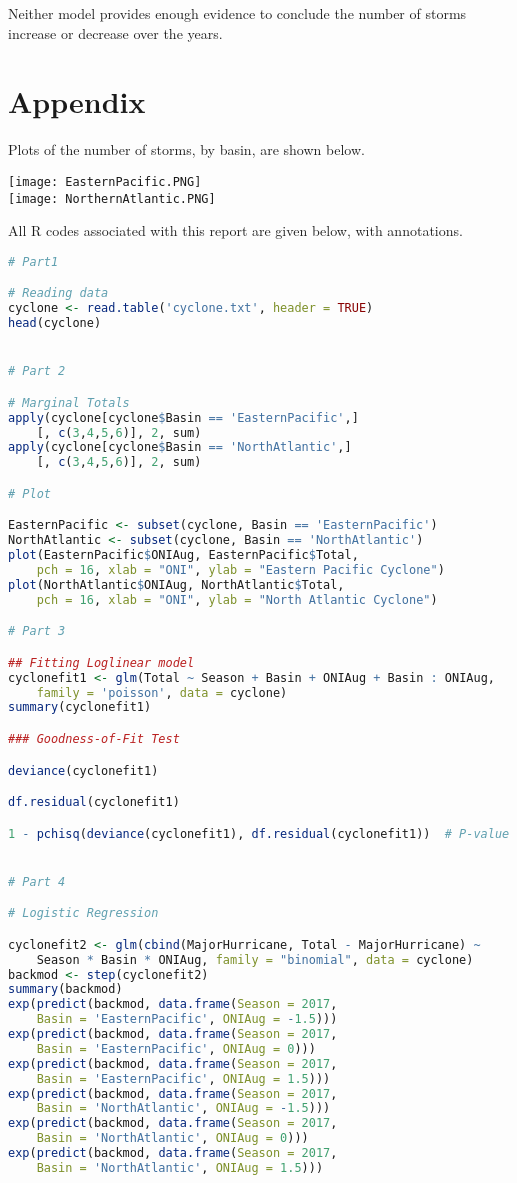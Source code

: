 \documentclass[12pt,a4paper]{article}
\begin{document}
Neither model provides enough evidence to conclude the number of storms increase or decrease over the years.

\section{Appendix}

Plots of the number of storms, by basin, are shown below.

\texttt{[image: EasternPacific.PNG]}\\
\texttt{[image: NorthernAtlantic.PNG]}

All R codes associated with this report are given below, with annotations.

\begin{lstlisting}[language=R]
# Part1

# Reading data
cyclone <- read.table('cyclone.txt', header = TRUE)
head(cyclone)


# Part 2

# Marginal Totals
apply(cyclone[cyclone$Basin == 'EasternPacific',]
	[, c(3,4,5,6)], 2, sum)
apply(cyclone[cyclone$Basin == 'NorthAtlantic',]
	[, c(3,4,5,6)], 2, sum)

# Plot

EasternPacific <- subset(cyclone, Basin == 'EasternPacific')
NorthAtlantic <- subset(cyclone, Basin == 'NorthAtlantic')
plot(EasternPacific$ONIAug, EasternPacific$Total, 
	pch = 16, xlab = "ONI", ylab = "Eastern Pacific Cyclone")
plot(NorthAtlantic$ONIAug, NorthAtlantic$Total, 
	pch = 16, xlab = "ONI", ylab = "North Atlantic Cyclone")

# Part 3

## Fitting Loglinear model
cyclonefit1 <- glm(Total ~ Season + Basin + ONIAug + Basin : ONIAug, 
	family = 'poisson', data = cyclone)
summary(cyclonefit1)

### Goodness-of-Fit Test

deviance(cyclonefit1)

df.residual(cyclonefit1)

1 - pchisq(deviance(cyclonefit1), df.residual(cyclonefit1))  # P-value


# Part 4

# Logistic Regression

cyclonefit2 <- glm(cbind(MajorHurricane, Total - MajorHurricane) ~ 
	Season * Basin * ONIAug, family = "binomial", data = cyclone)
backmod <- step(cyclonefit2)
summary(backmod)
exp(predict(backmod, data.frame(Season = 2017, 
	Basin = 'EasternPacific', ONIAug = -1.5)))
exp(predict(backmod, data.frame(Season = 2017, 
	Basin = 'EasternPacific', ONIAug = 0)))
exp(predict(backmod, data.frame(Season = 2017, 
	Basin = 'EasternPacific', ONIAug = 1.5)))
exp(predict(backmod, data.frame(Season = 2017, 
	Basin = 'NorthAtlantic', ONIAug = -1.5)))
exp(predict(backmod, data.frame(Season = 2017, 
	Basin = 'NorthAtlantic', ONIAug = 0)))
exp(predict(backmod, data.frame(Season = 2017, 
	Basin = 'NorthAtlantic', ONIAug = 1.5)))


\end{lstlisting}
\end{document}
